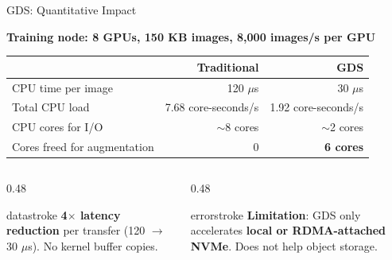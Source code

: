 \documentclass[aspectratio=169, 12pt]{beamer}
\begin{document}
\begin{frame}{GDS: Quantitative Impact}

\small
\textbf{Training node: 8 GPUs, 150 KB images, 8,000 images/s per GPU}

\vspace{0.1cm}
\renewcommand{\arraystretch}{1.2}
{\footnotesize
\begin{tabular}{@{}lrr@{}}
  \toprule
  & \textbf{Traditional} & \textbf{GDS} \\
  \midrule
  CPU time per image     & 120 $\mu$s         & 30 $\mu$s \\
  Total CPU load         & 7.68 core-seconds/s & 1.92 core-seconds/s \\
  CPU cores for I/O      & $\sim$8 cores       & $\sim$2 cores \\
  Cores freed for augmentation & 0              & \textbf{6 cores} \\
  \bottomrule
\end{tabular}
}

\vspace{0.15cm}
\begin{columns}[T]
  \begin{column}{0.48\textwidth}
    \begin{mlsyscard}{datastroke}
    {\footnotesize \textbf{4$\times$ latency reduction} per transfer (120 $\to$ 30 $\mu$s). No kernel buffer copies.}
    \end{mlsyscard}
  \end{column}
  \begin{column}{0.48\textwidth}
    \begin{mlsyscard}{errorstroke}
    {\footnotesize \textbf{Limitation}: GDS only accelerates \textbf{local or RDMA-attached NVMe}. Does not help object storage.}
    \end{mlsyscard}
  \end{column}
\end{columns}

\end{frame}
\end{document}
